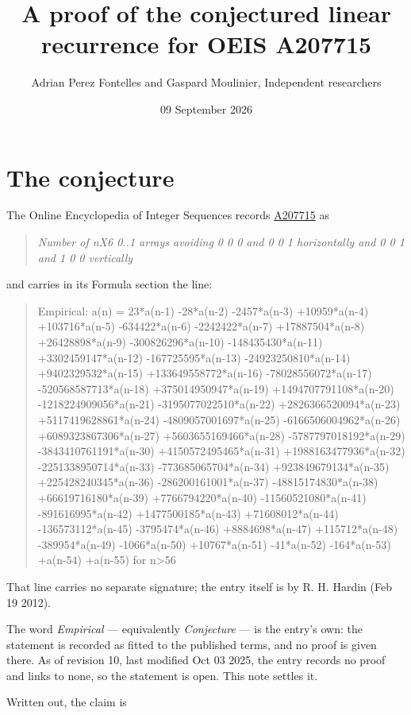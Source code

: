 \documentclass[11pt]{article}
\title{A proof of the conjectured linear recurrence for OEIS A207715}
\author{Adrian Perez Fontelles and Gaspard Moulinier, Independent researchers}
\date{09 September 2026}
\theoremstyle{definition}
\begin{document}
\maketitle
\section{The conjecture}

The Online Encyclopedia of Integer Sequences records \href{https://oeis.org/A207715}{A207715} as

\begin{quote}\itshape Number of nX6 0..1 arrays avoiding 0 0 0 and 0 0 1 horizontally and 0 0 1 and 1 0 0 vertically\end{quote}

and carries in its Formula section the line:

\begin{quote}\ttfamily Empirical: a(n) = 23*a(n-1) -28*a(n-2) -2457*a(n-3) +10959*a(n-4) +103716*a(n-5) -634422*a(n-6) -2242422*a(n-7) +17887504*a(n-8) +26428898*a(n-9) -300826296*a(n-10) -148435430*a(n-11) +3302459147*a(n-12) -167725595*a(n-13) -24923250810*a(n-14) +9402329532*a(n-15) +133649558772*a(n-16) -78028556072*a(n-17) -520568587713*a(n-18) +375014950947*a(n-19) +1494707791108*a(n-20) -1218224909056*a(n-21) -3195077022510*a(n-22) +2826366520094*a(n-23) +5117419628861*a(n-24) -4809057001697*a(n-25) -6166506004962*a(n-26) +6089323867306*a(n-27) +5603655169466*a(n-28) -5787797018192*a(n-29) -3843410761191*a(n-30) +4150572495465*a(n-31) +1988163477936*a(n-32) -2251338950714*a(n-33) -773685065704*a(n-34) +923849679134*a(n-35) +225428240345*a(n-36) -286200161001*a(n-37) -48815174830*a(n-38) +66619716180*a(n-39) +7766794220*a(n-40) -11560521080*a(n-41) -891616995*a(n-42) +1477500185*a(n-43) +71608012*a(n-44) -136573112*a(n-45) -3795474*a(n-46) +8884698*a(n-47) +115712*a(n-48) -389954*a(n-49) -1066*a(n-50) +10767*a(n-51) -41*a(n-52) -164*a(n-53) +a(n-54) +a(n-55) for n>56\end{quote}

That line carries no separate signature; the entry itself is by R. H. Hardin (Feb 19 2012).

The word {\itshape Empirical} --- equivalently {\itshape Conjecture} --- is the entry's own: the statement is recorded as fitted to the published terms, and no proof is given there. As of revision 10, last modified Oct 03 2025, the entry records no proof and links to none, so the statement is open. This note settles it.

Written out, the claim is
\end{document}

